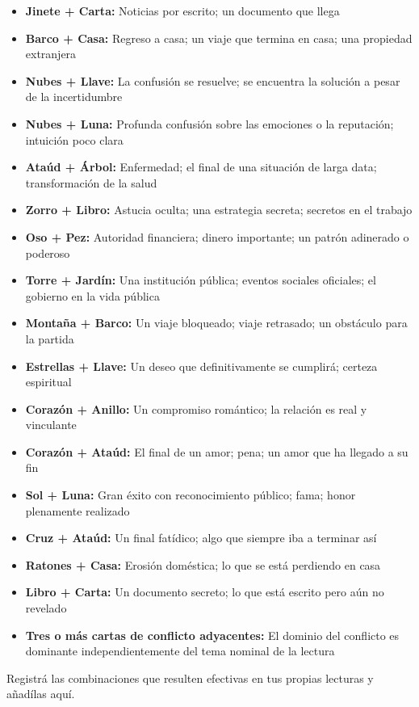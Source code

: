 \begin{itemize}
\tightlist
\item
  \textbf{Jinete + Carta:} Noticias por escrito; un documento que llega
\item
  \textbf{Barco + Casa:} Regreso a casa; un viaje que termina en casa; una propiedad extranjera
\item
  \textbf{Nubes + Llave:} La confusión se resuelve; se encuentra la solución a pesar de la incertidumbre
\item
  \textbf{Nubes + Luna:} Profunda confusión sobre las emociones o la reputación; intuición poco clara
\item
  \textbf{Ataúd + Árbol:} Enfermedad; el final de una situación de larga data; transformación de la salud
\item
  \textbf{Zorro + Libro:} Astucia oculta; una estrategia secreta; secretos en el trabajo
\item
  \textbf{Oso + Pez:} Autoridad financiera; dinero importante; un patrón adinerado o poderoso
\item
  \textbf{Torre + Jardín:} Una institución pública; eventos sociales oficiales; el gobierno en la vida pública
\item
  \textbf{Montaña + Barco:} Un viaje bloqueado; viaje retrasado; un obstáculo para la partida
\item
  \textbf{Estrellas + Llave:} Un deseo que definitivamente se cumplirá; certeza espiritual
\item
  \textbf{Corazón + Anillo:} Un compromiso romántico; la relación es real y vinculante
\item
  \textbf{Corazón + Ataúd:} El final de un amor; pena; un amor que ha llegado a su fin
\item
  \textbf{Sol + Luna:} Gran éxito con reconocimiento público; fama; honor plenamente realizado
\item
  \textbf{Cruz + Ataúd:} Un final fatídico; algo que siempre iba a terminar así
\item
  \textbf{Ratones + Casa:} Erosión doméstica; lo que se está perdiendo en casa
\item
  \textbf{Libro + Carta:} Un documento secreto; lo que está escrito pero aún no revelado
  \item
  \textbf{Tres o más cartas de conflicto adyacentes:} El dominio del conflicto es dominante independientemente del tema nominal de la lectura
\end{itemize}

Registrá las combinaciones que resulten efectivas en tus propias lecturas y añadílas aquí.

